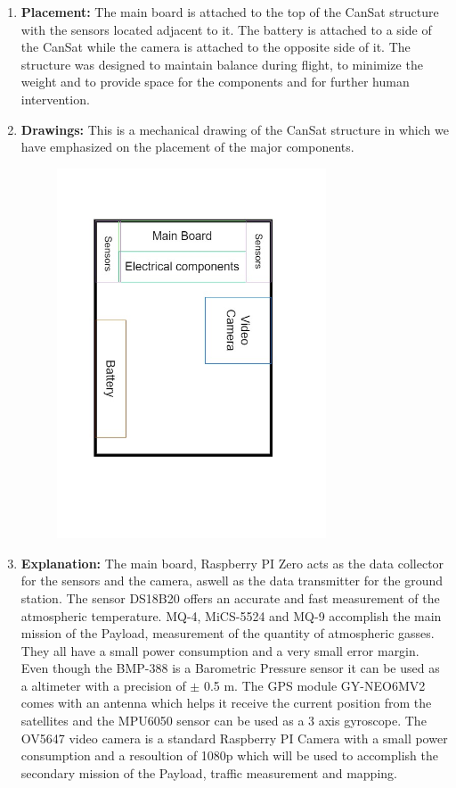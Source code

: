 \documentclass[11pt]{article}
\begin{document}
\begin{enumerate}
\item \textbf{Placement:} The main board is attached to the top of the CanSat structure with the sensors located adjacent to it. The battery is attached to a side of the CanSat while the camera is attached to the opposite side of it. The structure was designed to maintain balance during flight, to minimize the weight and to provide space for the components and for further human intervention.
\vspace{0.25cm}
\item \textbf{Drawings:} This is a mechanical drawing of the CanSat structure in which we have emphasized on the placement of the major components.

\begin{figure}[hbt!]
\includegraphics[width=8cm]{Component_placement}
\centering
\end{figure}

\item \textbf{Explanation:} The main board, Raspberry PI Zero acts as the data collector for the sensors and the camera, aswell as the data transmitter for the ground station. The sensor DS18B20 offers an accurate and fast measurement of the atmospheric temperature. MQ-4, MiCS-5524 and MQ-9 accomplish the main mission of the Payload, measurement of the quantity of atmospheric gasses. They all have a small power consumption and a very small error margin. Even though the BMP-388 is a Barometric Pressure sensor it can be used as a altimeter with a precision of $\pm$ 0.5 m. The GPS module GY-NEO6MV2 comes with an antenna which helps it receive the current position from the satellites and the MPU6050 sensor can be used as a 3 axis gyroscope. The OV5647 video camera is a standard Raspberry PI Camera with a small power consumption and a resoultion of 1080p which will be used to accomplish the secondary mission of the Payload, traffic measurement and mapping.

\end{enumerate}
\end{document}
